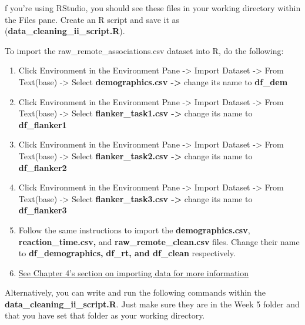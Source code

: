 \documentclass[
]{book}
\providecommand{\tightlist}{%
  \setlength{\itemsep}{0pt}\setlength{\parskip}{0pt}}
\begin{document}
f you're using RStudio, you should see these files in your working directory within the Files pane. Create an R script and save it as (\textbf{data\_cleaning\_ii\_script.R}).

To import the raw\_remote\_associations.csv dataset into R, do the following:

\begin{enumerate}
\def\labelenumi{\arabic{enumi}.}
\tightlist
\item
  Click Environment in the Environment Pane -\textgreater{} Import Dataset -\textgreater{} From Text(base) -\textgreater{} Select \textbf{demographics.csv -\textgreater{}} change its name to \textbf{df\_dem}
\item
  Click Environment in the Environment Pane -\textgreater{} Import Dataset -\textgreater{} From Text(base) -\textgreater{} Select \textbf{flanker\_task1.csv -\textgreater{}} change its name to \textbf{df\_flanker1}
\item
  Click Environment in the Environment Pane -\textgreater{} Import Dataset -\textgreater{} From Text(base) -\textgreater{} Select \textbf{flanker\_task2.csv -\textgreater{}} change its name to \textbf{df\_flanker2}
\item
  Click Environment in the Environment Pane -\textgreater{} Import Dataset -\textgreater{} From Text(base) -\textgreater{} Select \textbf{flanker\_task3.csv -\textgreater{}} change its name to \textbf{df\_flanker3}
\item
  Follow the same instructions to import the \textbf{demographics.csv}, \textbf{reaction\_time.csv,} and \textbf{raw\_remote\_clean.csv} files. Change their name to \textbf{df\_demographics,} \textbf{df\_rt, and df\_clean} respectively.
\item
  \hyperref[importing]{See Chapter 4's section on importing data for more information}
\end{enumerate}

Alternatively, you can write and run the following commands within the \textbf{data\_cleaning\_ii\_script.R}. Just make sure they are in the Week 5 folder and that you have set that folder as your working directory.
\end{document}
